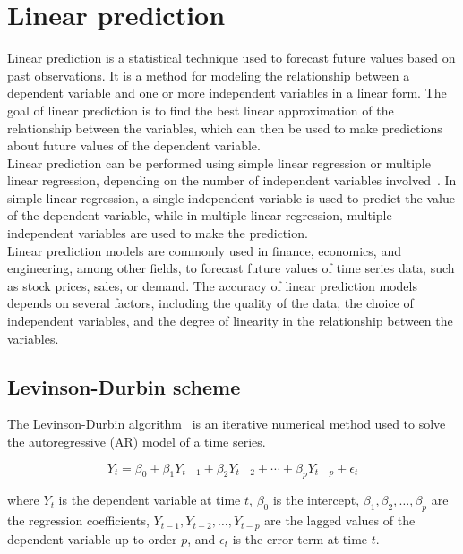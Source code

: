     \section{Linear prediction} \label{sec:lp}
    Linear prediction is a statistical technique used to forecast future values based on past observations. It is a method for modeling the
    relationship between a dependent variable and one or more independent variables in a linear form. The goal of linear prediction is to find
    the best linear approximation of the relationship between the variables, which can then be used to make predictions about future values of
    the dependent variable.
    \\
    Linear prediction can be performed using simple linear regression or multiple linear regression, depending on the number of independent variables
    involved~\cite{Parks}. In simple linear regression, a single independent variable is used to predict the value of the dependent variable,
    while in multiple linear
    regression, multiple independent variables are used to make the prediction.
    \\
    Linear prediction models are commonly used in finance, economics, and engineering, among other fields, to forecast future values of time series data,
    such as stock prices, sales, or demand. The accuracy of linear prediction models depends on several factors, including the quality of the data,
    the choice of independent variables, and the degree of linearity in the relationship between the variables.

    \subsection{Levinson-Durbin scheme} \label{subsec:levinson}

    The Levinson-Durbin algorithm~\cite{Levinson} is an iterative numerical method used to solve the autoregressive (AR) model of a time series.

    \begin{equation} \label{eq:levinson}
        Y_t = \beta_0 + \beta_1 Y_{t-1} + \beta_2 Y_{t-2} + \cdots + \beta_p Y_{t-p} + \epsilon_t
    \end{equation}

    where $Y_t$ is the dependent variable at time $t$, $\beta_0$ is the intercept, $\beta_1, \beta_2, \dots, \beta_p$ are the
    regression coefficients, $Y_{t-1}, Y_{t-2}, \dots, Y_{t-p}$ are the lagged values of the dependent variable up to order $p$, and $\epsilon_t$ is
    the error term at time $t$.


